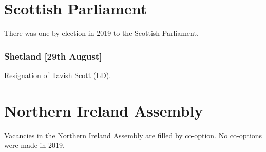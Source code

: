\documentclass[a4paper,openany]{book}
\begin{document}
\section{Scottish Parliament}

There was one by-election in 2019 to the Scottish Parliament.

\subsubsection*{Shetland \hspace*{\fill}\nolinebreak[1]%
\enspace\hspace*{\fill}
[29th August]}


Resignation of Tavish Scott (LD).
%
%
%
%

\section{Northern Ireland Assembly}

Vacancies in the Northern Ireland Assembly are filled by co-option.
No co-options were made in 2019.
%
\end{document}
